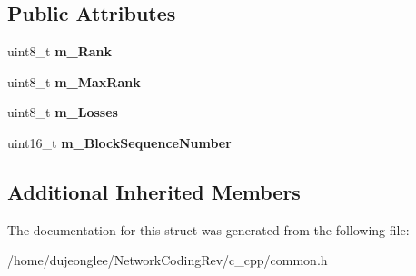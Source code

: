\subsection*{Public Attributes}
\begin{DoxyCompactItemize}
\item 
uint8\+\_\+t {\bfseries m\+\_\+\+Rank}\hypertarget{struct_network_coding_1_1_header_1_1_data_ack_a7b55caf18d0365add6f33ce5c054cee1}{}\label{struct_network_coding_1_1_header_1_1_data_ack_a7b55caf18d0365add6f33ce5c054cee1}

\item 
uint8\+\_\+t {\bfseries m\+\_\+\+Max\+Rank}\hypertarget{struct_network_coding_1_1_header_1_1_data_ack_aa5ed1e395967aa8513ec40f7bbed2769}{}\label{struct_network_coding_1_1_header_1_1_data_ack_aa5ed1e395967aa8513ec40f7bbed2769}

\item 
uint8\+\_\+t {\bfseries m\+\_\+\+Losses}\hypertarget{struct_network_coding_1_1_header_1_1_data_ack_ae10b7d635306ee5a5cb4b48e77a82c9a}{}\label{struct_network_coding_1_1_header_1_1_data_ack_ae10b7d635306ee5a5cb4b48e77a82c9a}

\item 
uint16\+\_\+t {\bfseries m\+\_\+\+Block\+Sequence\+Number}\hypertarget{struct_network_coding_1_1_header_1_1_data_ack_abb7ebded32aa8e1154d09008cdc20d02}{}\label{struct_network_coding_1_1_header_1_1_data_ack_abb7ebded32aa8e1154d09008cdc20d02}

\end{DoxyCompactItemize}
\subsection*{Additional Inherited Members}


The documentation for this struct was generated from the following file\+:\begin{DoxyCompactItemize}
\item 
/home/dujeonglee/\+Network\+Coding\+Rev/c\+\_\+cpp/common.\+h\end{DoxyCompactItemize}

